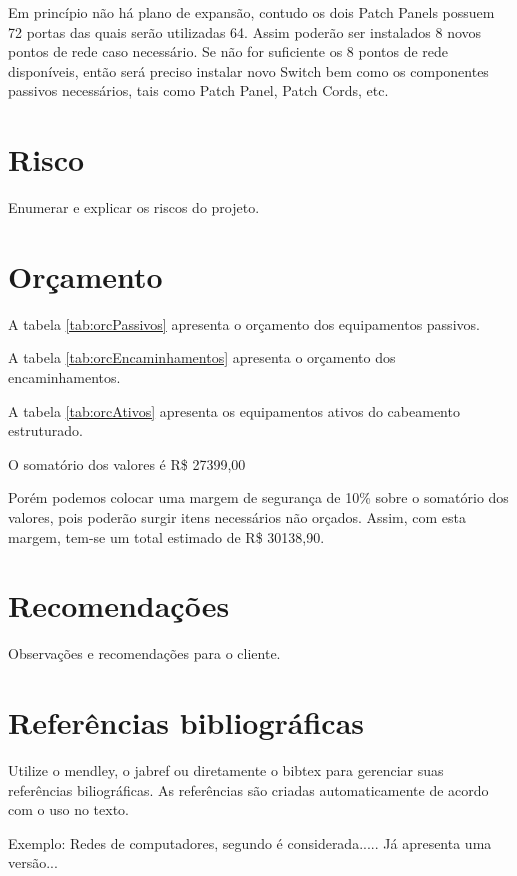 \documentclass[	DIV=calc,%
							paper=a4,%
							fontsize=12pt,%
							onecolumn]{scrartcl}	 					%
\begin{document}
Em princípio não há plano de expansão, contudo os dois Patch Panels possuem 72 portas das quais serão utilizadas 64. Assim poderão ser instalados 8 novos pontos de rede caso necessário.
Se não for suficiente os 8 pontos de rede disponíveis, então será preciso instalar novo Switch bem como os componentes passivos necessários, tais como Patch Panel, Patch Cords, etc.

\section{Risco}
Enumerar e explicar os riscos do projeto.

\section{Orçamento}

A tabela \ref{tab:orcPassivos} apresenta o orçamento dos equipamentos passivos.



A tabela \ref{tab:orcEncaminhamentos} apresenta o orçamento dos encaminhamentos.



A tabela \ref{tab:orcAtivos} apresenta os equipamentos ativos do cabeamento estruturado.



O somatório dos valores é R\$ 27399,00

Porém podemos colocar uma margem de segurança de 10\% sobre o somatório dos valores, pois poderão surgir itens necessários não orçados. Assim, com esta margem, tem-se um total estimado de R\$ 30138,90. 

\section{Recomendações}
Observações e recomendações para o cliente.

\section{Referências bibliográficas}
Utilize o mendley, o jabref ou diretamente o bibtex para gerenciar suas referências biliográficas. As referências são criadas automaticamente de acordo com o uso no texto.

Exemplo: Redes de computadores, segundo \cite{t2013} é considerada..... Já \cite{kurose2010} apresenta uma versão...
\end{document}
